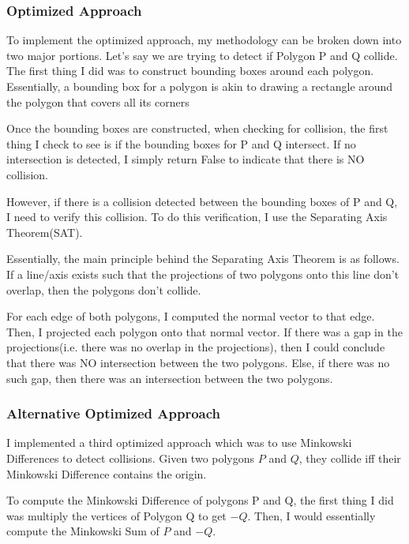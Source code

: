 \documentclass{article}
\begin{document}
\subsubsection{Optimized Approach}
To implement the optimized approach, my methodology can be broken down into two major portions. Let's say we are trying to detect if Polygon P and Q collide. The first thing I did was to construct bounding boxes around each polygon. Essentially, a bounding box for a polygon is akin to drawing a rectangle around the polygon that covers all its corners \newline 

Once the bounding boxes are constructed, when checking for collision, the first thing I check to see is if the bounding boxes for P and Q intersect. If no intersection is detected, I simply return False to indicate that there is NO collision. \newline 

However, if there is a collision detected between the bounding boxes of P and Q, I need to verify this collision. To do this verification, I use the Separating Axis Theorem(SAT). \newline 

Essentially, the main principle behind the Separating Axis Theorem is as follows. If a line/axis exists such that the projections of two polygons onto this line don't overlap, then the polygons don't collide. \newline 

For each edge of both polygons, I computed the normal vector to that edge. Then, I projected each polygon onto that normal vector. If there was a gap in the projections(i.e. there was no overlap in the projections), then I could conclude that there was NO intersection between the two polygons. Else, if there was no such gap, then there was an intersection between the two polygons. 

\subsubsection{Alternative Optimized Approach}
I implemented a third optimized approach which was to use Minkowski Differences to detect collisions. Given two polygons $P$ and $Q$, they collide iff their Minkowski Difference contains the origin. \newline 

To compute the Minkowski Difference of polygons P and Q, the first thing I did was multiply the vertices of Polygon Q to get $-Q$. Then, I would essentially compute the Minkowski Sum of $P$ and $-Q$. \newline 
\end{document}
